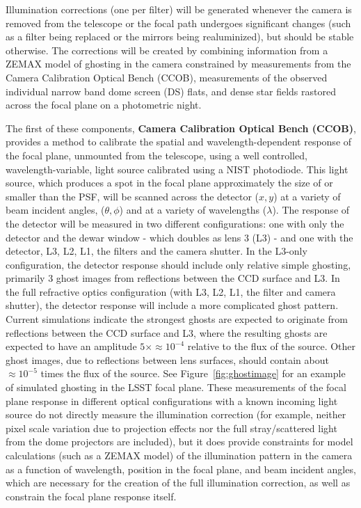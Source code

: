 \documentclass[12pt,preprint]{aastex}
\begin{document}
Illumination corrections (one per filter) will be generated whenever
the camera is removed from the telescope or the focal path undergoes
significant changes (such as a filter being replaced or the mirrors
being realuminized), but should be stable otherwise. The corrections
will be created by combining information from a ZEMAX model of
ghosting in the camera constrained by measurements from the Camera
Calibration Optical Bench (CCOB), measurements of the observed
individual narrow band dome screen (DS) flats, and dense star fields
rastored across the focal plane on a photometric night.

The first of these components, {\bf Camera Calibration Optical Bench
(CCOB)}, provides a method to calibrate the spatial and
wavelength-dependent response of the focal plane, unmounted from the
telescope, using a well controlled, wavelength-variable, light source
calibrated using a NIST photodiode. This light source, which produces
a spot in the focal plane approximately the size of or smaller than
the PSF, will be scanned across the detector ($x,y$) at a variety of
beam incident angles, ($\theta,\phi$) and at a variety of wavelengths
($\lambda$).  The response of the detector will be measured in two
different configurations: one with only the detector and the dewar
window - which doubles as lens 3 (L3) - and one with the detector, L3,
L2, L1, the filters and the camera shutter. In the L3-only
configuration, the detector response should include only relative
simple ghosting, primarily 3 ghost images from reflections between the
CCD surface and L3. In the full refractive optics configuration (with
L3, L2, L1, the filter and camera shutter), the detector response will
include a more complicated ghost pattern. Current simulations indicate
the strongest ghosts are expected to originate from reflections
between the CCD surface and L3, where the resulting ghosts are
expected to have an amplitude $5\times\approx10^{-4}$ relative to the
flux of the source. Other ghost images, due to reflections between
lens surfaces, should contain about $\approx10^{-5}$ times the flux of
the source.  See Figure~\ref{fig:ghostimage} for an example of
simulated ghosting in the LSST focal plane. These measurements of the
focal plane response in different optical configurations with a known
incoming light source do not directly measure the illumination
correction (for example, neither pixel scale variation due to
projection effects nor the full stray/scattered light from the dome
projectors are included), but it does provide constraints for model
calculations (such as a ZEMAX model) of the illumination pattern in
the camera as a function of wavelength, position in the focal plane,
and beam incident angles, which are necessary for the creation of the
full illumination correction, as well as constrain the focal plane
response itself.
\end{document}
